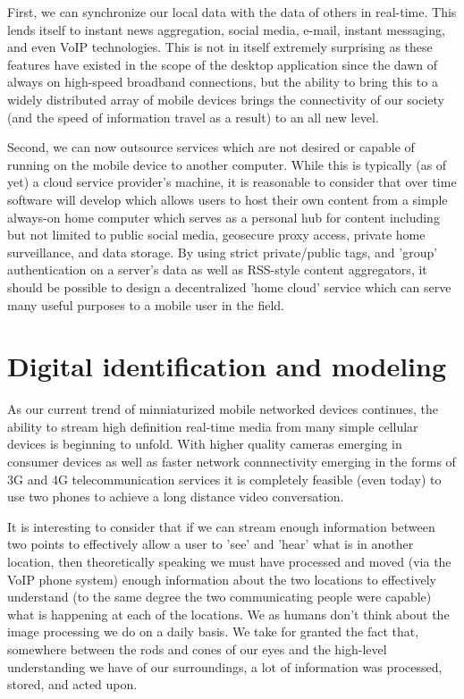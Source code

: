 \documentclass[a4paper,12pt]{report}
\begin{document}
First, we can synchronize our local data with the data of others in real-time. This lends itself to instant news aggregation, social media, e-mail, instant messaging, and even VoIP technologies. This is not in itself extremely surprising as these features have existed in the scope of the desktop application since the dawn of always on high-speed broadband connections, but the ability to bring this to a widely distributed array of mobile devices brings the connectivity of our society (and the speed of information travel as a result) to an all new level.

Second, we can now outsource services which are not desired or capable of running on the mobile device to another computer. While this is typically (as of yet) a cloud service provider's machine, it is reasonable to consider that over time software will develop which allows users to host their own content from a simple always-on home computer which serves as a personal hub for content including but not limited to public social media, geosecure proxy access, private home surveillance, and data storage. By using strict private/public tags, and 'group' authentication on a server's data as well as RSS-style content aggregators, it should be possible to design a decentralized 'home cloud' service which can serve many useful purposes to a mobile user in the field.

\section{Digital identification and modeling}

As our current trend of minniaturized mobile networked devices continues, the ability to stream high definition real-time media from many simple cellular devices is beginning to unfold. With higher quality cameras emerging in consumer devices as well as faster network connnectivity emerging in the forms of 3G and 4G telecommunication services it is completely feasible (even today) to use two phones to achieve a long distance video conversation.

It is interesting to consider that if we can stream enough information between two points to effectively allow a user to 'see' and 'hear' what is in another location, then theoretically speaking we must have processed and moved (via the VoIP phone system) enough information about the two locations to effectively understand (to the same degree the two communicating people were capable) what is happening at each of the locations. We as humans don't think about the image processing we do on a daily basis. We take for granted the fact that, somewhere between the rods and cones of our eyes and the high-level understanding we have of our surroundings, a lot of information was processed, stored, and acted upon.
\end{document}
